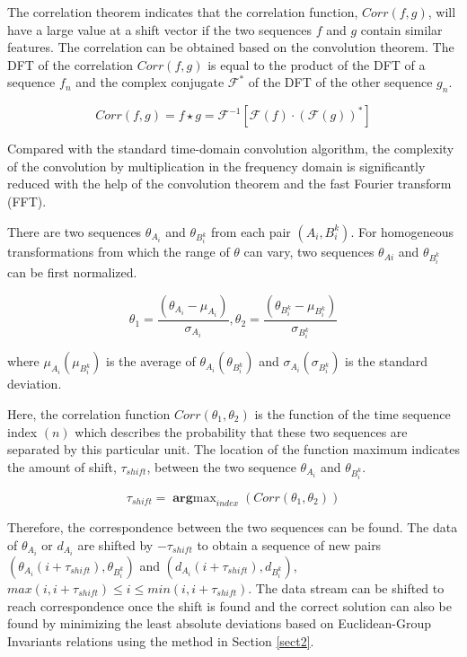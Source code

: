 \documentclass[conference,letterpaper]{IEEEtran}
\begin{document}
The correlation theorem indicates that the correlation function, $Corr(f,g)$, will have a large value at a shift vector if the two sequences $f$ and $g$ contain similar features. The correlation can be obtained based on the convolution theorem. The DFT of the correlation $Corr(f,g)$ is equal to the product of the DFT of a sequence $f_{n}$ and the complex conjugate $\mathcal{F}^{*}$ of the DFT of the other sequence $g_n$.

\begin{equation}\label{equ25}
    Corr(f,g)=f \star g = \mathcal{F}^{-1}[\mathcal{F}(f) \cdot (\mathcal{F}(g))^{*}]
\end{equation}

Compared with the standard time-domain convolution algorithm, the complexity of the convolution by multiplication in the frequency domain is significantly reduced with the help of the convolution theorem and the fast Fourier transform (FFT).

There are two sequences $\theta_{A_{i}}$ and $\theta_{B_{i}^{k}}$ from each pair $(A_{i},B_{i}^{k})$. For homogeneous transformations from which the range of $\theta$ can vary, two sequences $\theta_{Ai}$ and $\theta_{B_{i}^{k}}$ can be first normalized.

\begin{equation}\label{equ26}
    \theta_{1}=\frac{(\theta_{A_{i}}-\mu_{A_{i}})}{\sigma_{A_{i}}}, \theta_{2}=\frac{(\theta_{B_{i}^{k}}-\mu_{B_{i}^{k}})}{\sigma_{B_{i}^{k}}}
\end{equation}

where $\mu_{A_{i}}(\mu_{B_{i}^{k}})$ is the average of $\theta_{A_{i}}(\theta_{B_{i}^{k}})$ and $\sigma_{A_{i}}(\sigma_{B_{i}^{k}})$ is the standard deviation.

Here, the correlation function $Corr(\theta_{1},\theta_{2})$  is the function of the time sequence index $(n)$ which describes the probability that these two sequences are separated by this particular unit. The location of the function maximum indicates the amount of shift, $\tau_{shift}$, between the two sequence $\theta_{A_{i}}$ and $\theta_{B_{i}^{k}}$.

\begin{equation}\label{equ27}
    \tau_{shift} = \mathop{\mathbf{arg}max}_{index}(Corr(\theta_{1},\theta_{2}))
\end{equation}

Therefore, the correspondence between the two sequences can be found. The data of $\theta_{A_{i}}$ or $d_{A_{i}}$ are shifted by $-\tau_{shift}$ to obtain a sequence of new pairs $(\theta_{A_{i}}(i+\tau_{shift}),\theta_{B_{i}^{k}})$ and $(d_{A_{i}}(i+\tau_{shift}),d_{B_{i}^{k}})$, $max(i,i+\tau_{shift})\leq i \leq min(i,i+\tau_{shift})$. The data stream can be shifted to reach correspondence once the shift is found and the correct solution can also be found by minimizing the least absolute deviations based on Euclidean-Group Invariants relations using the method in Section \ref{sect2}.
\end{document}
